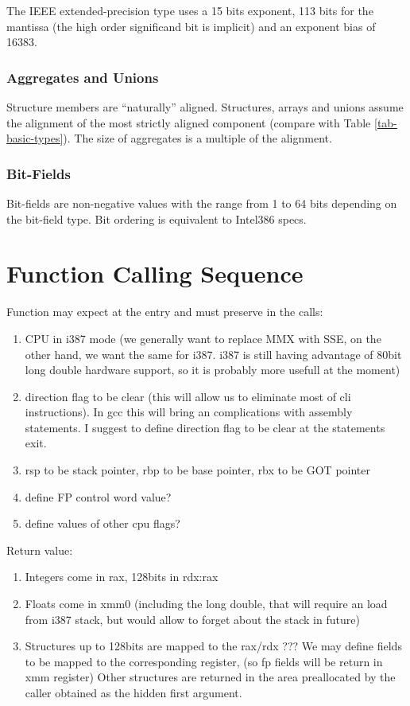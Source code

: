 The IEEE extended-precision type uses a 15 bits exponent, 113 bits for
the mantissa (the high order significand bit is implicit) and an
exponent bias of 16383.

\subsubsection{Aggregates and Unions}

Structure members are "`naturally"' aligned.  Structures, arrays and
unions assume the alignment of the most strictly aligned component
(compare with Table \ref{tab-basic-types}). The size of aggregates is
a multiple of the alignment.


\subsubsection{Bit-Fields}

Bit-fields are non-negative values with the range from 1 to 64 bits
depending on the bit-field type. Bit ordering is equivalent to
Intel386 specs.


\section{Function Calling Sequence}

Function may expect at the entry and must preserve in the calls:
\begin{enumerate}
\item CPU in i387 mode (we generally want to replace MMX with SSE, on the other
      hand, we want the same for i387.  i387 is still having advantage of 80bit
      long double hardware support, so it is probably more usefull at the moment)
\item direction flag to be clear (this will allow us to eliminate most of cli
      instructions).  In gcc this will bring an complications with assembly
      statements.  I suggest to define direction flag to be clear at the
      statements exit.
\item rsp to be stack pointer, rbp to be base pointer, rbx to be GOT pointer
\item define FP control word value?
\item define values of other cpu flags?
\end{enumerate}
Return value:
\begin{enumerate}
\item Integers come in rax, 128bits in rdx:rax
\item Floats come in xmm0 (including the long double, that will require an
      load from i387 stack, but would allow to forget about the stack in future)
\item Structures up to 128bits are mapped to the rax/rdx
      ??? We may define fields to be mapped to the corresponding register,
      (so fp fields will be return in xmm register)
      Other structures are returned in the area preallocated by the caller
      obtained as the hidden first argument.
\end{enumerate}


